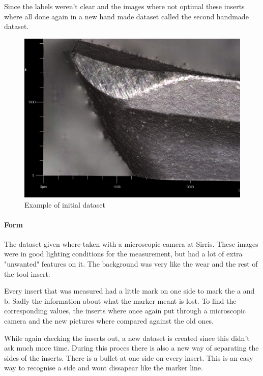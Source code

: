 			Since the labels weren't clear and the images where not optimal these inserts where all done again in a new hand made dataset called the second handmade dataset.
			
			\begin{figure}[hbtp]
			\centering
			\includegraphics[scale=0.2]{fig/Vision/Dataset/handmade_datasets/initial_dataset/initial dataset pictuer.PNG}
			\caption{Example of initial dataset}
			\label{fig:dataset:initial}
			\end{figure}

\paragraph{Form}

The dataset given where taken with a microscopic camera at Sirris. These images were in good lighting conditions for the measurement, but had a lot of extra "unwanted" features on it. The background was very like the wear and the rest of the tool insert. 

Every insert that was measured had a little mark on one side to mark the a and b. Sadly the information about what the marker meant is lost. To find the corresponding values, the inserts where once again put through a microscopic camera and the new pictures where compared against the old ones. 

While again checking the inserts out, a new dataset is created since this didn't ask much more time. During this proces there is also a new way of separating the sides of the inserts. There is a bullet at one side on every insert. This is an easy way to recognise a side and wont dissapear like the marker line. 
			
